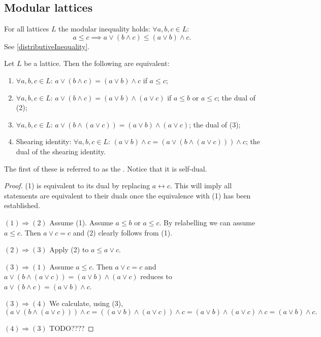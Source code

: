 \subsection{Modular lattices}
For all lattices $L$ the modular inequality holds: $\forall a,b,c \in L$:
\[ a\leq c \implies a \vee (b\wedge c) \leq (a\vee b) \wedge c. \]
See \ref{distributiveInequality}.

\begin{proposition} \label{modularEquivalences}
Let $L$ be a lattice. Then the following are equivalent:
\begin{enumerate}
\item $\forall a,b,c\in L$: $a \vee (b\wedge c) = (a\vee b) \wedge c$ if $a\leq c$;
\item $\forall a,b,c\in L$: $a \vee (b\wedge c) = (a\vee b) \wedge (a\vee c)$ if $a\leq b$ or $a\leq c$; the dual of (2);
\item $\forall a,b,c\in L$: $a\vee (b\wedge (a\vee c)) = (a\vee b)\wedge (a\vee c)$; the dual of (3);
\item \textup{Shearing identity}: $\forall a,b,c\in L$: $(a\vee b) \wedge c = (a\vee (b\wedge (a\vee c)))\wedge c$; the dual of the shearing identity.
\end{enumerate}
\end{proposition}
The first of these is referred to as the . Notice that it is self-dual.
\begin{proof}
(1) is equivalent to its dual by replacing $a\leftrightarrow c$. This will imply all statements are equivalent to their duals once the equivalence with (1) has been established. 

$\boxed{(1)\Rightarrow (2)}$ Assume (1). Assume $a\leq b$ or $a\leq c$. By relabelling we can assume $a\leq c$.  Then $a\vee c = c$ and (2) clearly follows from (1).


$\boxed{(2)\Rightarrow (3)}$ Apply (2) to $a\leq a\vee c$.

$\boxed{(3)\Rightarrow (1)}$ Assume $a\leq c$. Then $a\vee c = c$ and $a\vee (b\wedge (a\vee c)) = (a\vee b)\wedge (a\vee c)$ reduces to $a \vee (b\wedge c) = (a\vee b) \wedge c$.

$\boxed{(3)\Rightarrow (4)}$ We calculate, using (3),
\[ (a\vee (b\wedge (a\vee c)))\wedge c = ((a\vee b)\wedge (a\vee c))\wedge c = (a\vee b) \wedge (a\vee c) \wedge c = (a\vee b) \wedge c. \]

$\boxed{(4)\Rightarrow (3)}$ TODO????
\end{proof}

